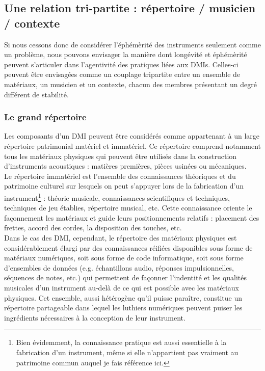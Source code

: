 \subsection{Une relation tri-partite : répertoire / musicien / contexte}

Si nous cessons donc de considérer l'éphémèrité des instruments seulement comme un problème, nous pouvons envisager la manière dont longévité et éphémèrité peuvent s'articuler dans l'agentivité des pratiques liées aux \glspl{DMI}. Celles-ci peuvent être envisagées comme un couplage tripartite entre un ensemble de matériaux, un musicien et un contexte, chacun des membres présentant un degré différent de stabilité.

\subsubsection{Le grand répertoire}

\noindent Les composants d'un \gls{DMI} peuvent être considérés comme appartenant à un large répertoire patrimonial matériel et immatériel. Ce répertoire comprend notamment tous les matériaux physiques qui peuvent être utilisés dans la construction d'instruments acoustiques : matières premières, pièces usinées ou mécaniques. \\
\indent Le répertoire immatériel est l'ensemble des connaissances théoriques et du patrimoine culturel sur lesquels on peut s'appuyer lors de la fabrication d'un instrument\footnote{Bien évidemment, la connaissance pratique est aussi essentielle à la fabrication d'un instrument, même si elle n'appartient pas vraiment au patrimoine commun auquel je fais référence ici.} : théorie musicale, connaissances scientifiques et techniques, techniques de jeu établies, répertoire musical, etc. Cette connaissance oriente le façonnement les matériaux et guide leurs positionnements relatifs :  placement des frettes, accord des cordes, la disposition des touches, etc.\\
\indent Dans le cas des \gls{DMI}, cependant, le répertoire des matériaux physiques est considérablement élargi par des connaissances réifiées disponibles sous forme de matériaux numériques, soit sous forme de code informatique, soit sous forme d'ensembles de données (e.g. échantillons audio, réponses impulsionnelles, séquences de notes, etc.) qui permettent de façonner l'indentité et les qualités musicales d'un instrument au-delà de ce qui est possible avec les matériaux physiques.
Cet ensemble, aussi hétérogène qu'il puisse paraître, constitue un répertoire partageable dans lequel les luthiers numériques peuvent puiser les ingrédients nécessaires à la conception de leur instrument.

